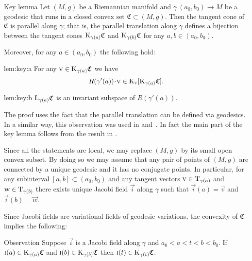 \documentclass[a4paper,10pt]{article}
\begin{document}
\begin{thm}{Key lemma}\label{lem:key}
Let $(M,g)$ be a Riemannian manifold and $\gamma\:(a_0,b_0)\to M$ be a geodesic that runs in a closed convex set $\mathfrak{C}\subset (M,g)$.
Then the tangent cone of $\mathfrak{C}$ is parallel along $\gamma$; that is, the parallel translation along $\gamma$ defines a bijection between the tangent cones $\mathrm{K}_{\gamma(a)}\mathfrak{C}$ and $\mathrm{K}_{\gamma(b)}\mathfrak{C}$ for any $a,b \in (a_0,b_0)$.

Moreover, for any $a\in (a_0,b_0)$ the following hold:
\begin{subthm}{lem:key:a}
For any $\text{\sc{v}}\in \mathrm{K}_{\gamma(a)}\mathfrak{C}$ we have
\[R(\gamma'(a))\cdot \vec{v}\in \K_\vec{v}[\K_{\gamma(a)}\mathfrak{C}].\]
\end{subthm}

\begin{subthm}{lem:key:b} 
$\mathrm{L}_{\gamma(a)}\mathfrak{C}$ is an invariant subspace of $R(\gamma'(a))$.
\end{subthm}

\end{thm}

The proof uses the fact that the parallel translation can be defined via geodesics.
In a similar way, this observation was used in \cite[Section 13]{Ber-Nik} and~\cite{Petruninpar}.
In fact the main part of the key lemma follows from the result in \cite{Petruninpar}.

Since all the statements are local, we may replace $(M,g)$ by its small open convex subset.
By doing so we may assume that any pair of points of $(M,g)$ are connected by a unique geodesic and it has no conjugate points.
In particular, for any subinterval $[a,b]\subset (a_0,b_0)$ and any tangent vectors $\text{\sc{v}} \in \mathrm{T}_{\gamma (a)}$ and $\text{\sc{w}} \in \mathrm{T}_{\gamma (b)}$ there exists unique Jacobi field $\vec{i}$ along $\gamma$ such that $\vec{i}(a)=\vec{v}$ and $\vec{i}(b)=\vec{w}$.

Since Jacobi fields are variational fields of geodesic variations, the convexity of $\mathfrak{C}$ implies the following: 

\begin{thm}{Observation}
Suppose $\vec{i}$ is a Jacobi field along %
$\gamma$ and $a_0<a<t<b<b_0$.
If 
$\text{\sc{i}}(a)\in \mathrm{K}_{\gamma(a)}\mathfrak{C}$ and $\text{\sc{i}}(b)\in \mathrm{K}_{\gamma(b)}\mathfrak{C}$
then $\text{\sc{i}}(t)\in \mathrm{K}_{\gamma(t)}\mathfrak{C}$.
\end{thm}%
\end{document}

